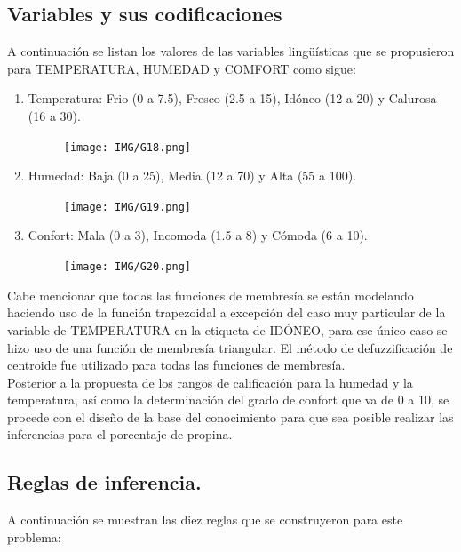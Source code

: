 \documentclass[11pt, letterpaper]{article}
\begin{document}
	
	\subsection{Variables y sus codificaciones}
	
	
	A continuación se listan los valores de las variables lingüísticas que se propusieron para TEMPERATURA, HUMEDAD y COMFORT como sigue:
	
	
	\begin{enumerate}
		\item Temperatura: Frio (0 a 7.5), Fresco (2.5 a 15), Idóneo (12 a 20) y Calurosa (16 a 30).
		\begin{figure}[h]
			\centering
			\texttt{[image: IMG/G18.png]}
		\end{figure}
		
		\item Humedad: Baja (0 a 25), Media (12 a 70) y Alta (55 a 100).
		\begin{figure}[h]
			\centering
			\texttt{[image: IMG/G19.png]}
		\end{figure}
		\newpage
		\item Confort: Mala (0 a 3), Incomoda (1.5 a 8) y Cómoda (6 a 10).
		\begin{figure}[h]
			\centering
			\texttt{[image: IMG/G20.png]}
		\end{figure}
	\end{enumerate}
	
	Cabe mencionar que todas las funciones de membresía se están modelando haciendo uso de la función trapezoidal a excepción del caso muy particular de la variable de TEMPERATURA en la etiqueta de IDÓNEO, para ese único caso se hizo uso de una función de membresía triangular. El método de defuzzificación de centroide fue utilizado para todas las funciones de membresía. \\
	
	Posterior a la propuesta de los rangos de calificación para la humedad y la temperatura, así como la determinación del grado de confort que va de 0 a 10, se procede con el diseño de la base del conocimiento para que sea posible realizar las inferencias para el porcentaje de propina.
	
	\subsection{Reglas de inferencia.}
	
	A continuación se muestran las diez reglas que se construyeron para este problema:
	
\end{document}

